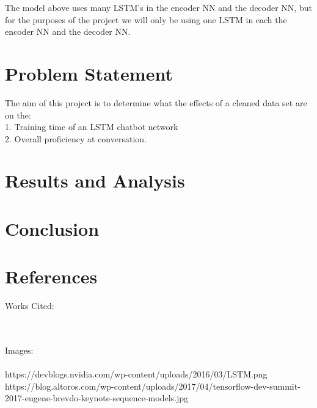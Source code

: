 \documentclass[titlepage]{article}
\newcommand\tab[1][1cm]{\hspace*{#1}}
\begin{document}
The model above uses many LSTM's in the encoder NN and the decoder NN, but for the purposes of the project we will only be using one LSTM in each the encoder NN and the decoder NN.


\section{Problem Statement}
The aim of this project is to determine what the effects of a cleaned data set are on the:\\
\tab 1. Training time of an LSTM chatbot network\\
\tab 2. Overall proficiency at conversation.

\section{Results and Analysis}

\section{Conclusion}

\section{References}
\large{Works Cited:}\\
\small{

}
~\\~\\
\large{Images:}\\
\small{
\\https://devblogs.nvidia.com/wp-content/uploads/2016/03/LSTM.png
\\https://blog.altoros.com/wp-content/uploads/2017/04/tensorflow-dev-summit-2017-eugene-brevdo-keynote-sequence-models.jpg
}
\end{document}
